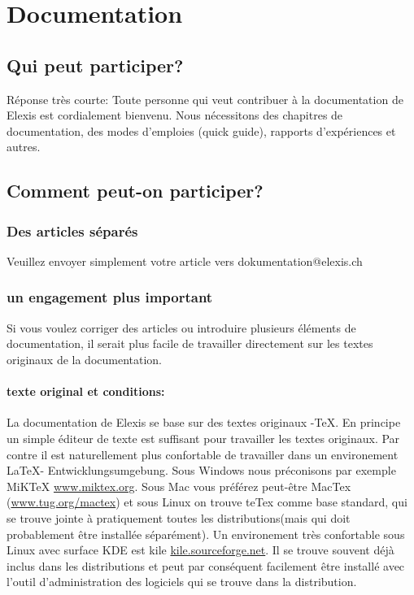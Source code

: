 \chapter{Documentation}
\section{Qui peut participer?}
\label{dokumentation}
Réponse très courte: Toute personne qui veut contribuer à la documentation de Elexis est cordialement bienvenu. Nous nécessitons des chapitres de documentation, des modes d'emploies (quick guide), rapports d'expériences et autres.

\section{Comment peut-on participer?}
\subsection{Des articles séparés}
Veuillez envoyer simplement votre article vers dokumentation@elexis.ch
\subsection{un engagement plus important}
Si vous voulez corriger des articles ou introduire plusieurs éléments de documentation, il serait plus facile de travailler directement sur les textes originaux de la documentation. 

\subsubsection{texte original et conditions:}
La documentation de Elexis se base sur des textes originaux -\TeX. En principe un simple éditeur de texte est suffisant pour travailler les textes originaux. Par contre il est naturellement plus confortable de travailler dans un environement \LaTeX - Entwicklungsumgebung. Sous Windows nous préconisons par exemple MiKTeX \href{http://www.miktex.org}{www.miktex.org}. Sous Mac vous préférez peut-être MacTex
(\href{http://www.tug.org/mactex}{www.tug.org/mactex}) et sous Linux
on trouve teTex comme base standard, qui se trouve jointe à pratiquement toutes les distributions(mais qui doit probablement être installée séparément). Un environement très confortable sous Linux avec surface KDE est kile
\href{http://kile.sourceforge.net/}{kile.sourceforge.net}. Il se trouve souvent déjà inclus dans les distributions et peut par conséquent facilement être installé avec l'outil d'administration des logiciels qui se trouve dans la distribution. 

